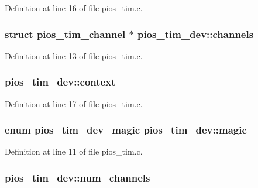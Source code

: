 Definition at line 16 of file pios\-\_\-tim.\-c.

\hypertarget{structpios__tim__dev_aa8efb40f5c838a19554da434d2eddf40}{
\subsubsection[{channels}]{\setlength{\rightskip}{0pt plus 5cm}struct {\bf pios\-\_\-tim\-\_\-channel} $\ast$ pios\-\_\-tim\-\_\-dev\-::channels}}\label{structpios__tim__dev_aa8efb40f5c838a19554da434d2eddf40}


Definition at line 13 of file pios\-\_\-tim.\-c.

\hypertarget{structpios__tim__dev_aa2ce9a6edd8c06b75330b994f67c95b8}{
\subsubsection[{context}]{ pios\-\_\-tim\-\_\-dev\-::context}}\label{structpios__tim__dev_aa2ce9a6edd8c06b75330b994f67c95b8}


Definition at line 17 of file pios\-\_\-tim.\-c.

\hypertarget{structpios__tim__dev_a3656bfa8d4df8ae08ce3c330edc916f9}{
\subsubsection[{magic}]{\setlength{\rightskip}{0pt plus 5cm}enum {\bf pios\-\_\-tim\-\_\-dev\-\_\-magic} pios\-\_\-tim\-\_\-dev\-::magic}}\label{structpios__tim__dev_a3656bfa8d4df8ae08ce3c330edc916f9}


Definition at line 11 of file pios\-\_\-tim.\-c.

\hypertarget{structpios__tim__dev_a2b129aa6d78b9ba69ff095d8a9c53356}{
\subsubsection[{num\-\_\-channels}]{ pios\-\_\-tim\-\_\-dev\-::num\-\_\-channels}}\label{structpios__tim__dev_a2b129aa6d78b9ba69ff095d8a9c53356}


